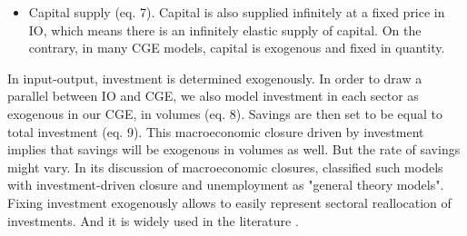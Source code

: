 \begin{itemize}
	\item Capital supply (eq. 7). Capital is also supplied infinitely at a fixed price in IO, which means there is an infinitely elastic supply of capital. On the contrary, in many CGE models, capital is exogenous and fixed in quantity.
\end{itemize}

In input-output, investment is determined exogenously. In order to draw a parallel between IO and CGE, we also model investment in each sector as exogenous in our CGE, in volumes (eq. 8). Savings are then set to be equal to total investment (eq. 9). 
This macroeconomic closure driven by investment implies that savings will be exogenous in volumes as well. But the rate of savings might vary. 
In its discussion of macroeconomic closures, \citet[p. 57]{Sen1963} classified such models with investment-driven closure and unemployment as "general theory models".
Fixing investment exogenously allows to easily represent sectoral reallocation of investments. And it is widely used in the literature \citep{Lehr2008,Lehr2012}.


